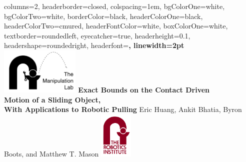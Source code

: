 \documentclass[potrait,paperwidth=20in,paperheight=30in,margin=1.5in,fontscale = 0.5]{baposter} %
\begin{document}
\begin{poster}
{
  columns=2,
  headerborder=closed, %
  colspacing=1em, %
  bgColorOne=white, %
  bgColorTwo=white, %
  borderColor=black, %
  headerColorOne=black, %
  headerColorTwo=cmured,%
  headerFontColor=white, %
  boxColorOne=white, %
  textborder=roundedleft, %
  eyecatcher=true, %
  headerheight=0.1\textheight, %
  headershape=roundedright, %
  headerfont=\large\bf\textsc, %
  linewidth=2pt %
}
%
{\includegraphics[height=6em]{images/mlab_logo.png}} %
{\Huge\textbf{Exact Bounds on the Contact Driven \\Motion of a Sliding
    Object,\\\vspace{1mm} With Applications to Robotic Pulling}
  \vspace{3mm}} %
  {{{Eric Huang, Ankit Bhatia, Byron Boots, and Matthew
      T. Mason}}\vspace{3mm}} %
{\includegraphics[height=6em]{images/ri_logo.png}} %

\end{poster}
\end{document}
